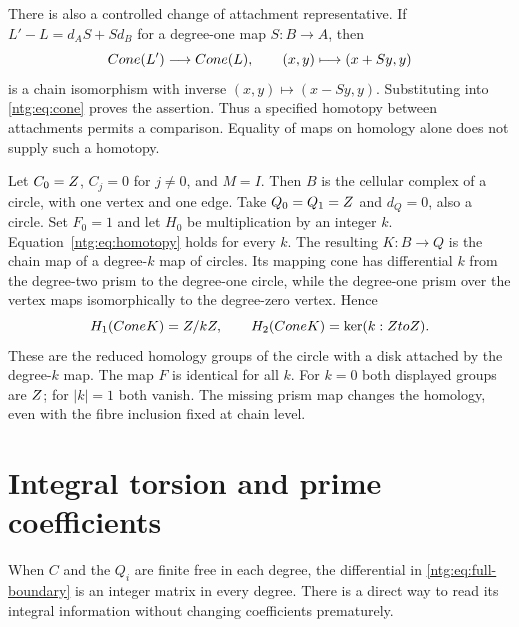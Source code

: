 There is also a controlled change of attachment representative. If
$L'-L=d_AS+Sd_B$ for a degree-one map $S:B\to A$, then
\[
 Cone(L')\longrightarrow Cone(L),\qquad (x,y)\longmapsto(x+Sy,y)
\]
is a chain isomorphism with inverse $(x,y)\mapsto(x-Sy,y)$.
Substituting into \eqref{ntg:eq:cone} proves the assertion. Thus a
specified homotopy between attachments permits a comparison. Equality
of maps on homology alone does not supply such a homotopy.

\begin{example}\label{ntg:ex:missing-H}
Let $C_0=Z$, $C_j=0$ for $j\ne0$, and $M=I$. Then $B$ is the
cellular complex of a circle, with one vertex and one edge.
Take $Q_0=Q_1=Z$ and $d_Q=0$, also a circle. Set $F_0=1$ and
let $H_0$ be multiplication by an integer $k$.
Equation~\eqref{ntg:eq:homotopy} holds for every $k$. The resulting
$K:B\to Q$ is the chain map of a degree-$k$ map of circles.
Its mapping cone has differential $k$ from the degree-two prism to
the degree-one circle, while the degree-one prism over the vertex
maps isomorphically to the degree-zero vertex. Hence
\[
 H_1(Cone K)=Z/kZ,\qquad
 H_2(Cone K)=\ker(k:ZtoZ).
\]
These are the reduced homology groups of the circle with a disk
attached by the degree-$k$ map. The map $F$ is identical for all $k$.
For $k=0$ both displayed groups are $Z$; for $|k|=1$ both vanish.
The missing prism map changes the homology, even with the fibre
inclusion fixed at chain level.
\end{example}

\section{Integral torsion and prime coefficients}\label{ntg:sec:torsion}

When $C$ and the $Q_i$ are finite free in each degree, the differential
in \eqref{ntg:eq:full-boundary} is an integer matrix in every degree.
There is a direct way to read its integral information without changing
coefficients prematurely.

